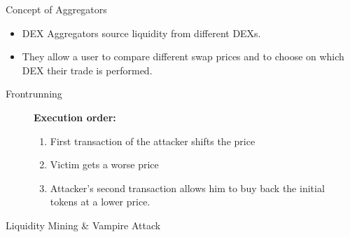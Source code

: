 \documentclass[]{beamer}
\begin{document}
\begin{frame}{Concept of Aggregators}
\begin{figure}
	\centering
	\resizebox{0.8\textwidth}{!}{
	\begin{tikzpicture}[scale=1.0, every node/.style={scale=1.0}]
			
	\end{tikzpicture}}
\end{figure}
	
\begin{itemize}
	\item DEX Aggregators source liquidity from different DEXs.
	\item They allow a user to compare different swap prices and to choose on which DEX their trade is performed.
\end{itemize}

\end{frame}


\begin{frame}{Frontrunning}
	\begin{figure}
		\begin{minipage}[c]{0.38\textwidth}
		\footnotesize
		\textbf{Execution order:}
			\begin{enumerate}
				\item<1-> First transaction of the attacker shifts the price
				\item<2-> Victim gets a worse price
				\item<3-> Attacker's second transaction allows him to buy back the initial tokens at a lower price.
			\end{enumerate}
		\end{minipage}
		\hfill
		\begin{minipage}[c]{0.6\textwidth}
			\begin{figure}[h!]
		\begin{center}
			
		\end{center}
	\end{figure}
	

		\end{minipage}
	\end{figure}
\end{frame}


\begin{frame}{Liquidity Mining \& Vampire Attack}
	\begin{figure}[h!]
		\begin{center}
			
		\end{center}
	\end{figure}
\end{frame}
\end{document}

